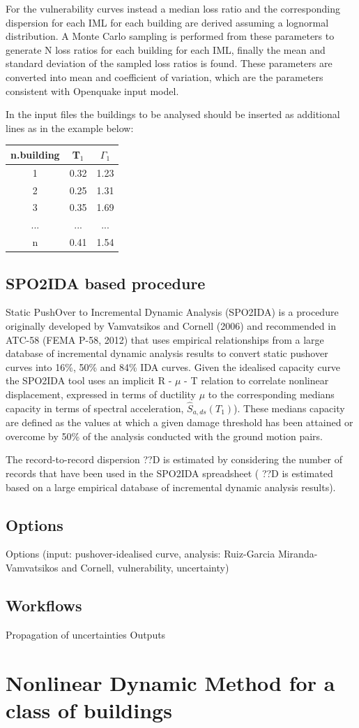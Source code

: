 For the vulnerability curves instead a median loss ratio and the corresponding dispersion for each IML for each building are derived assuming a lognormal distribution. A Monte Carlo sampling is performed from these parameters to generate N loss ratios for each building for each IML, finally the mean and standard deviation of the sampled loss ratios is found. These parameters are converted into mean and coefficient of variation, which are the parameters consistent with Openquake input model.

In the input files the buildings to be analysed should be inserted as additional lines as in the example below:

\begin{table}[H]
\centering
\begin{tabular}{|c|c|c|} \hline
\textbf{n.building} & \textbf{T$_1$} & \textbf{$\Gamma_1$} \\ \hline
1 & 0.32 & 1.23\\ \hline
2 & 0.25 & 1.31\\ \hline
3 & 0.35 & 1.69\\ \hline
... & ... & ...\\ \hline
n & 0.41 & 1.54\\ \hline
\end{tabular}
\end{table}

\subsection{SPO2IDA based procedure}
Static PushOver to Incremental Dynamic Analysis (SPO2IDA) is a procedure originally developed by Vamvatsikos and Cornell (2006) and recommended in ATC-58 (FEMA P-58, 2012) that uses empirical relationships from a large database of incremental dynamic analysis results to convert static pushover curves into 16\%, 50\% and 84\% IDA curves. Given the idealised capacity curve the SPO2IDA tool uses an implicit R - $\mu$ - T relation to correlate nonlinear displacement, expressed in terms of ductility $\mu$ to the corresponding medians capacity in terms of spectral acceleration, $\hat{S}_{a,ds}(T_1) $). These medians capacity are defined as the values at which a given damage threshold has been attained or overcome by 50\% of the analysis conducted with the ground motion pairs. 

The record-to-record dispersion ??D is estimated by considering the number of records that have been used in the SPO2IDA spreadsheet ( ??D is estimated based on a large empirical database of incremental dynamic analysis results).

\subsection{Options}
Options (input: pushover-idealised curve, analysis: Ruiz-Garcia Miranda-Vamvatsikos and Cornell, vulnerability, uncertainty)

\subsection{Workflows}

Propagation of uncertainties
Outputs

\section{Nonlinear Dynamic Method for a class of buildings}
